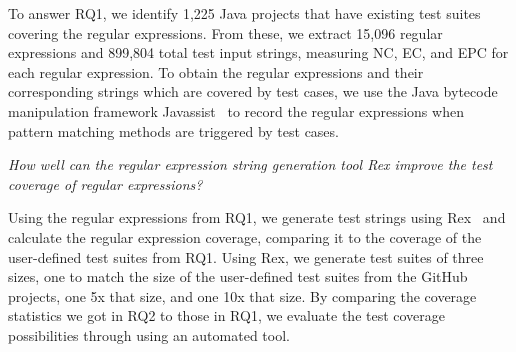\noindent To answer RQ1, we identify 1,225 Java projects that have existing test suites covering the regular expressions. From these, we extract 15,096 regular expressions and 899,804 total test input strings, measuring NC, EC, and EPC for each regular expression. 
To obtain the regular expressions and their corresponding strings which are covered by test cases, we use the Java bytecode manipulation framework Javassist~\cite{javassist} to record the regular expressions when pattern matching methods are triggered by test cases. 

  {\em How well can the regular expression string generation tool Rex  improve the test coverage of regular expressions?}

\noindent Using the regular expressions from RQ1, we generate test strings using Rex~\cite{rex} and calculate the regular expression coverage, comparing it to the coverage of the user-defined test suites from RQ1. 
Using Rex, we generate test suites of three sizes, one to match the size of the user-defined test suites from the GitHub projects, one 5x that size, and one 10x that size. 
By comparing the coverage statistics we got in RQ2 to those in RQ1, we evaluate the test coverage possibilities through using an automated tool.

